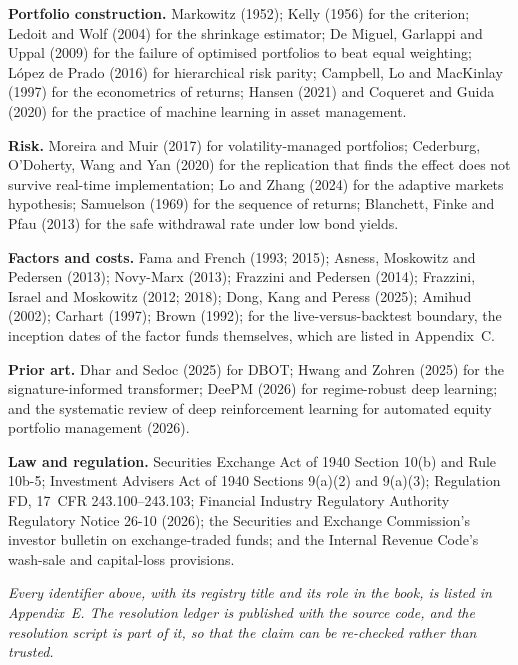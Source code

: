 \vspace{6pt}
\noindent\textbf{Portfolio construction.} Markowitz (1952); Kelly (1956)
for the criterion; Ledoit and Wolf (2004) for the shrinkage estimator; De
Miguel, Garlappi and Uppal (2009) for the failure of optimised portfolios
to beat equal weighting; L\'opez de Prado (2016) for hierarchical risk
parity; Campbell, Lo and MacKinlay (1997) for the econometrics of
returns; Hansen (2021) and Coqueret and Guida (2020) for the practice of
machine learning in asset management.

\vspace{6pt}
\noindent\textbf{Risk.} Moreira and Muir (2017) for volatility-managed
portfolios; Cederburg, O'Doherty, Wang and Yan (2020) for the replication
that finds the effect does not survive real-time implementation; Lo and
Zhang (2024) for the adaptive markets hypothesis; Samuelson (1969) for the
sequence of returns; Blanchett, Finke and Pfau (2013) for the safe
withdrawal rate under low bond yields.

\vspace{6pt}
\noindent\textbf{Factors and costs.} Fama and French (1993; 2015);
Asness, Moskowitz and Pedersen (2013); Novy-Marx (2013); Frazzini and
Pedersen (2014); Frazzini, Israel and Moskowitz (2012; 2018); Dong, Kang
and Peress (2025); Amihud (2002); Carhart (1997); Brown (1992); for the
live-versus-backtest boundary, the inception dates of the factor funds
themselves, which are listed in Appendix~C.

\vspace{6pt}
\noindent\textbf{Prior art.} Dhar and Sedoc (2025) for DBOT; Hwang and
Zohren (2025) for the signature-informed transformer; DeePM (2026) for
regime-robust deep learning; and the systematic review of deep
reinforcement learning for automated equity portfolio management (2026).

\vspace{6pt}
\noindent\textbf{Law and regulation.} Securities Exchange Act of 1940
Section 10(b) and Rule 10b-5; Investment Advisers Act of 1940 Sections
9(a)(2) and 9(a)(3); Regulation FD, 17~CFR 243.100--243.103; Financial
Industry Regulatory Authority Regulatory Notice 26-10 (2026); the
Securities and Exchange Commission's investor bulletin on exchange-traded
funds; and the Internal Revenue Code's wash-sale and capital-loss
provisions.

\vspace{6pt}
\noindent\small\textit{Every identifier above, with its registry title and
its role in the book, is listed in Appendix~E. The resolution ledger is
published with the source code, and the resolution script is part of it, so
that the claim can be re-checked rather than trusted.}
\clearpage

